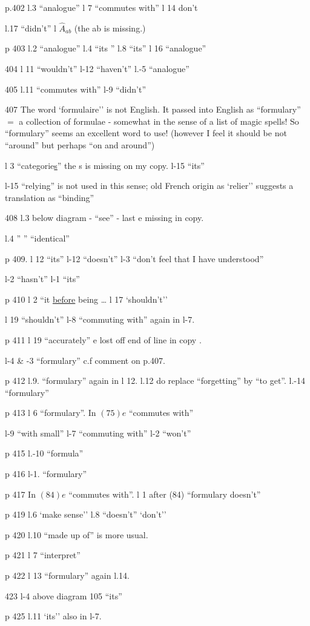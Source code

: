 
p.402 l.3 ``analogue'' \quad l 7 ``commutes with'' \quad l 14 don't

l.17 ``didn't'' \quad l  $\hat{A}_{ab}$ (the ab is missing.)

p 403 l.2 ``analogue'' \quad l.4 ``its '' \quad l.8 ``its'' \quad l 16 ``analogue''

404 l 11 ``wouldn't'' \quad l-12 ``haven't'' \quad l.-5 ``analogue''

405 l.11 ``commutes with'' \quad l-9 ``didn't''

407 The word `formulaire'' is not English. It passed into English as ``formulary'' $=$ a collection of formulae - somewhat in the sense of a list of magic spells! So ``formulary'' seems an excellent word to use! (however I feel it should be not ``around'' but perhaps ``on and around'')

l 3 ``categorie\uline{s}'' the s is missing on my copy. \quad l-15 ``its''

l-15 ``relying'' is not used in this sense;   old French origin as  `relier'' suggests a translation as ``binding''

408 l.3 below diagram - ``see'' - last e missing in copy.

l.4  '' \quad '' \quad ``identical''

p 409. l 12 ``its'' \quad l-12 ``doesn't'' \quad l-3 ``don't feel that I have understood''

l-2 ``hasn't'' \quad l-1 ``its''

p 410  \quad l 2 ``it \uline{before} being \ldots{}  \quad l 17 `shouldn't''

l 19 ``shouldn't'' \quad l-8 ``commuting with'' again in l-7.

p 411 l 19 ``accurately'' \quad e lost off end of line in copy .

l-4 \& -3 ``formulary'' c.f comment on p.407.

p 412 l.9. ``formulary'' again in l 12. \quad l.12 do replace ``forgetting'' by ``to get''. \quad l.-14 ``formulary''

p 413 l 6 ``formulary''. \quad In $(75)e$ ``commutes with''

l-9 ``with small'' \quad l-7 ``commuting with'' \quad l-2 ``won't''

p 415 l.-10 ``formula''

p 416 l-1. ``formulary''

p 417 In $(84)e$ ``commutes with''. \quad l 1 after (84) ``formulary doesn't''

p 419 l.6 `make sense'' \quad l.8 ``doesn't'' \quad `don't''

p 420 l.10 ``made up of'' is more usual.

p 421 l 7 ``interpret''

p 422 l 13 ``formulary'' again  l.14.

 423 l-4 above diagram 105 ``its''

p 425 l.11 `its'' also in l-7.
